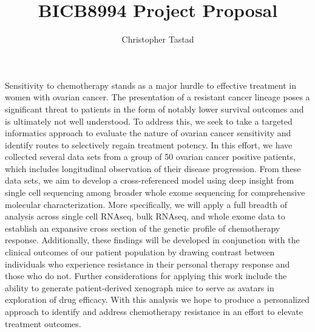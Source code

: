 \documentclass{article}
\title{BICB8994 Project Proposal}
\author{Christopher Tastad}
\begin{document}
\maketitle

\par Sensitivity to chemotherapy stands as a major hurdle to effective treatment in women with ovarian cancer. The presentation of a resistant cancer lineage poses a significant threat to patients in the form of notably lower survival outcomes and is ultimately not well understood. To address this, we seek to take a targeted informatics approach to evaluate the nature of ovarian cancer sensitivity and identify routes to selectively regain treatment potency. In this effort, we have collected several data sets from a group of 50 ovarian cancer positive patients, which includes longitudinal observation of their disease progression. From these data sets, we aim to develop a cross-referenced model using deep insight from single cell sequencing among broader whole exome sequencing for comprehensive molecular characterization. More specifically, we will apply a full breadth of analysis across single cell RNAseq, bulk RNAseq, and whole exome data to establish an expansive cross section of the genetic profile of chemotherapy response. Additionally, these findings will be developed in conjunction with the clinical outcomes of our patient population by drawing contrast between individuals who experience resistance in their personal therapy response and those who do not. Further considerations for applying this work include the ability to generate patient-derived xenograph mice to serve as avatars in exploration of drug efficacy. With this analysis we hope to produce a personalized approach to identify and address chemotherapy resistance in an effort to elevate treatment outcomes.
\end{document}
